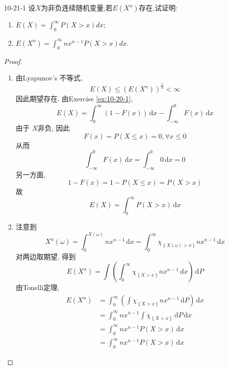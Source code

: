 \documentclass[../main.tex]{subfiles}
\begin{document}
 \begin{exercise}{}{10-21-1}
    设$X$为非负连续随机变量,若$E(X^n)$存在,试证明:
\begin{enumerate}
\item $E(X) = \int_{0}^{\infty} P(X > x) dx;$
\item $E(X^n) = \int_{0}^{\infty} nx^{n-1} P(X > x) dx.$
\end{enumerate}
 \end{exercise}
\begin{proof}
    \begin{enumerate}
        \item 由Lyapunov's 不等式,  \[
        E\left( X \right)\le \left( E\left( X^{n} \right)  \right)^{\frac{1 }{n } }< \infty  
        \]因此期望存在. 由Exercise \ref{ex:10-20-1}, \[
        E\left( X \right)= \int_{0}^{\infty}\left( 1-F\left( x \right)  \right)\,\mathrm{d} x-\int_{-\infty}^{0}F\left( x \right)\,\mathrm{d} x   
        \]由于 \(  X  \)非负, 因此 \[
        F\left( x \right)= P\left( X\le x \right)= 0, \forall x\le 0  
        \] 从而 \[
        \int_{-\infty}^{0}F\left( x \right)\,\mathrm{d} x= \int_{-\infty}^{0}0\,\mathrm{d} x= 0 
        \] 另一方面,  \[
        1-F\left( x \right)= 1-P\left( X\le x \right)= P\left( X> x \right)   
        \]故 \[
        E\left( X \right)=  \int_{0}^{\infty}P\left( X> x \right)\,\mathrm{d} x  
        \]
        \item  注意到  \[
      X^{n}\left(  \omega  \right)= \int_{0}^{X\left(  \omega  \right) }n x^{n-1}\,\mathrm{d} x= \int_{0}^{\infty} \chi _{\left\{ X\left(  \omega  \right)> x  \right\}}n x^{n-1}\,\mathrm{d} x
        \]对两边取期望, 得到 \[
        E\left( X^{n} \right)= \int \left( \int_{0}^{\infty} {\chi _{\left\{ X> x \right\}}} n x^{n-1}\,\mathrm{d}x \right)\,\mathrm{d} P  
        \]由Tonelli定理, \[
        \begin{aligned}
        E\left( X^{n} \right)&= \int_{0}^{\infty} \left( \int \chi _{\left\{ X> x \right\}} nx^{n-1}\,\mathrm{d} P\right)\,\mathrm{d} x\\ 
         & = \int_{0}^{\infty} nx^{n-1} \int  \chi _{\left\{ X> x \right\}}\,\mathrm{d} P\,\mathrm{d} x \\ 
          &=  \int _{0}^{\infty}nx^{n-1}P\left( X> x \right)\,\mathrm{d} x\\ 
           &=  \int_{0}^{\infty} nx^{n-1}P\left( X> x \right)\,\mathrm{d} x  
        \end{aligned}  
        \]
    \end{enumerate}
    
\end{proof}
\end{document}
